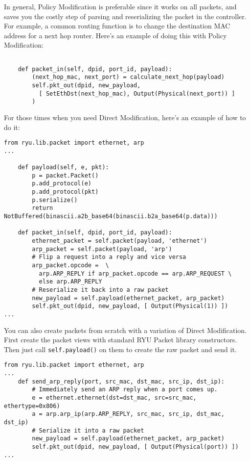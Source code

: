 In general, Policy Modification is preferable since it works on all packets, and saves you the costly step of parsing and 
reserializing the packet in the controller.
For example, a common routing function is to change the destination MAC address for a next hop router.
Here's an example of doing this with Policy Modification:

\begin{verbatim}

    def packet_in(self, dpid, port_id, payload):
        (next_hop_mac, next_port) = calculate_next_hop(payload)
        self.pkt_out(dpid, new_payload, 
          [ SetEthDst(next_hop_mac), Output(Physical(next_port)) ]
        )	

\end{verbatim}

For those times when you need Direct Modification, here's an example of how to do it:

\begin{verbatim}
from ryu.lib.packet import ethernet, arp
...

    def payload(self, e, pkt):
        p = packet.Packet()
        p.add_protocol(e)
        p.add_protocol(pkt)
        p.serialize()
        return NotBuffered(binascii.a2b_base64(binascii.b2a_base64(p.data)))

    def packet_in(self, dpid, port_id, payload):
        ethernet_packet = self.packet(payload, 'ethernet') 
        arp_packet = self.packet(payload, 'arp')
        # Flip a request into a reply and vice versa
        arp_packet.opcode =  \ 
          arp.ARP_REPLY if arp_packet.opcode == arp.ARP_REQUEST \
          else arp.ARP_REPLY
	    # Reserialize it back into a raw packet
        new_payload = self.payload(ethernet_packet, arp_packet)
        self.pkt_out(dpid, new_payload, [ Output(Physical(1)) ])	
...
\end{verbatim}

You can also create packets from scratch with a variation of Direct Modification.  
First create the packet views with standard RYU Packet library constructors.
Then just call \texttt{self.payload()} on them to create the raw packet and send it.  

\begin{verbatim}
from ryu.lib.packet import ethernet, arp
...
    def send_arp_reply(port, src_mac, dst_mac, src_ip, dst_ip):
        # Immediately send an ARP reply when a port comes up.
        e = ethernet.ethernet(dst=dst_mac, src=src_mac, ethertype=0x806)
        a = arp.arp_ip(arp.ARP_REPLY, src_mac, src_ip, dst_mac, dst_ip)
	    # Serialize it into a raw packet
        new_payload = self.payload(ethernet_packet, arp_packet)
        self.pkt_out(dpid, new_payload, [ Output(Physical(port)) ])	
...
\end{verbatim}

